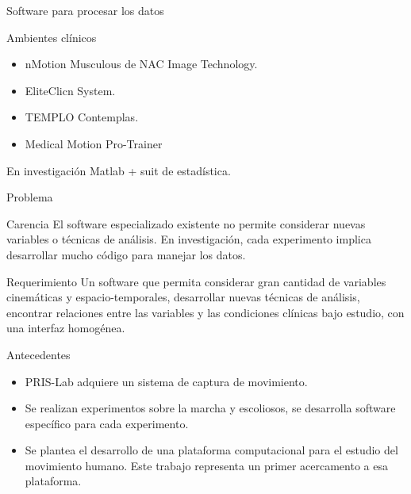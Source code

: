 \documentclass{beamer} %
\begin{document}
\begin{frame}{Software para procesar los datos}
    \begin{block}{Ambientes clínicos}
    \begin{itemize}
        \item nMotion Musculous de NAC Image Technology.
        \item EliteClicn System.
        \item TEMPLO Contemplas.
        \item Medical Motion Pro-Trainer
    \end{itemize}
    \end{block}
    \begin{block}{En investigación}
        Matlab + suit de estadística.
    \end{block}
\end{frame}

\begin{frame}{Problema}
    \begin{block}{Carencia}
        El software especializado existente no permite considerar nuevas variables o técnicas de análisis. En investigación, cada experimento implica desarrollar mucho código para manejar los datos.
    \end{block}
    \begin{block}{Requerimiento}
        Un software que permita considerar gran cantidad de variables cinemáticas y espacio-temporales, desarrollar nuevas técnicas de análisis, encontrar relaciones entre las variables y las condiciones clínicas bajo estudio, con una interfaz homogénea. 
    \end{block}
\end{frame}

\begin{frame}{Antecedentes}
    \begin{itemize}
        \item PRIS-Lab adquiere un sistema de captura de movimiento.
        \item Se realizan experimentos sobre la marcha y escoliosos, se desarrolla software específico para cada experimento. 
        \item Se plantea el desarrollo de una plataforma computacional para el estudio del movimiento humano. Este trabajo representa un primer acercamento a esa plataforma.  
    \end{itemize}
\end{frame}

\end{document}
